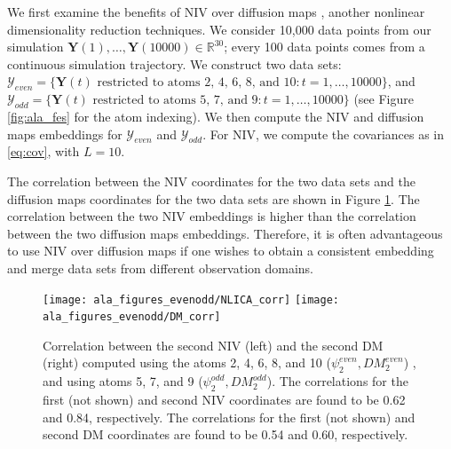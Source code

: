 \documentclass[aip,jcp,preprint]{revtex4-1}
\begin{document}
We first examine the benefits of NIV over diffusion maps \cite{coifman2005geometric}, another nonlinear dimensionality reduction techniques.
%
We consider 10,000 data points from our simulation $\mathbf{Y}(1), \dots, \mathbf{Y}(10000) \in \mathbb{R}^{30}$; every 100 data points comes from a continuous simulation trajectory.
%
We construct two data sets:
%
$\mathcal{Y}_{even} = \{\mathbf{Y}(t) \text{ restricted to atoms 2, 4, 6, 8, and 10}: t=1, \dots, 10000 \}$,
and $\mathcal{Y}_{odd} = \{\mathbf{Y}(t) \text{ restricted to atoms 5, 7, and 9}: t=1, \dots, 10000 \}$ (see Figure \ref{fig:ala_fes} for the atom indexing).
%
We then compute the NIV and diffusion maps embeddings for $\mathcal{Y}_{even}$ and $\mathcal{Y}_{odd}$.
%
For NIV, we compute the covariances as in \eqref{eq:cov}, with $L=10$.

The correlation between the NIV coordinates for the two data sets and the diffusion maps coordinates for the two data sets are shown in Figure \ref{fig:ala_corr}.
%
The correlation between the two NIV embeddings is higher than the correlation between the two diffusion maps embeddings.
Therefore, it is often advantageous to use NIV over diffusion maps if one wishes to obtain a consistent embedding and merge data sets from different observation domains.

\begin{figure}[ht]
    \texttt{[image: ala\_figures\_evenodd/NLICA\_corr]}
    \texttt{[image: ala\_figures\_evenodd/DM\_corr]}
    \caption{Correlation between the second NIV (left) and the second DM (right) computed using the atoms 2, 4, 6, 8, and 10 ($\psi_2^{even}, DM_2^{even}$) , and using atoms 5, 7, and 9 ($\psi_2^{odd}, DM_2^{odd}$).
    The correlations for the first (not shown) and second NIV coordinates are found to be 0.62 and 0.84, respectively.
    The correlations for the first (not shown) and second DM coordinates are found to be 0.54 and 0.60, respectively. }
    \label{fig:ala_corr}
\end{figure}

\end{document}
